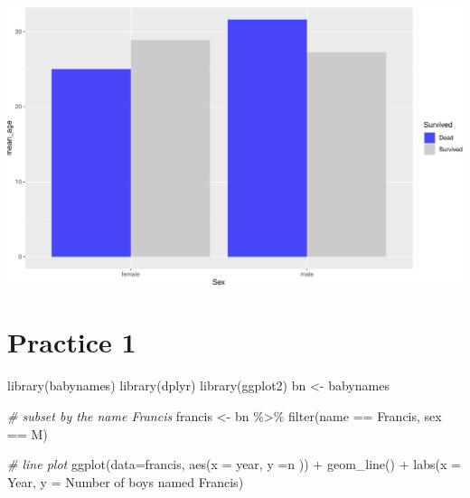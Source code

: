 \documentclass[
]{book}
\newenvironment{Shaded}{\begin{snugshade}}{\end{snugshade}}
\newcommand{\AttributeTok}[1]{\textcolor[rgb]{0.77,0.63,0.00}{#1}}
\newcommand{\CommentTok}[1]{\textcolor[rgb]{0.56,0.35,0.01}{\textit{#1}}}
\newcommand{\FunctionTok}[1]{\textcolor[rgb]{0.00,0.00,0.00}{#1}}
\newcommand{\NormalTok}[1]{#1}
\newcommand{\OtherTok}[1]{\textcolor[rgb]{0.56,0.35,0.01}{#1}}
\newcommand{\SpecialCharTok}[1]{\textcolor[rgb]{0.00,0.00,0.00}{#1}}
\newcommand{\StringTok}[1]{\textcolor[rgb]{0.31,0.60,0.02}{#1}}
\begin{document}
\includegraphics{figures/unnamed-chunk-147-1.pdf}

\hypertarget{practice-1}{%
\section*{Practice 1}\label{practice-1}}

\begin{Shaded}
\begin{Highlighting}[]
\FunctionTok{library}\NormalTok{(babynames)}
\FunctionTok{library}\NormalTok{(dplyr)}
\FunctionTok{library}\NormalTok{(ggplot2)}
\NormalTok{bn }\OtherTok{\textless{}{-}}\NormalTok{ babynames}

\CommentTok{\# subset by the name Francis}
\NormalTok{francis }\OtherTok{\textless{}{-}}\NormalTok{ bn }\SpecialCharTok{\%\textgreater{}\%} \FunctionTok{filter}\NormalTok{(name }\SpecialCharTok{==} \StringTok{\textquotesingle{}Francis\textquotesingle{}}\NormalTok{, sex }\SpecialCharTok{==} \StringTok{\textquotesingle{}M\textquotesingle{}}\NormalTok{)}

\CommentTok{\# line plot}
\FunctionTok{ggplot}\NormalTok{(}\AttributeTok{data=}\NormalTok{francis, }\FunctionTok{aes}\NormalTok{(}\AttributeTok{x =}\NormalTok{ year, }\AttributeTok{y =}\NormalTok{n )) }\SpecialCharTok{+} \FunctionTok{geom\_line}\NormalTok{() }\SpecialCharTok{+} \FunctionTok{labs}\NormalTok{(}\AttributeTok{x =} \StringTok{\textquotesingle{}Year\textquotesingle{}}\NormalTok{, }\AttributeTok{y =} \StringTok{\textquotesingle{}Number of boys named Francis\textquotesingle{}}\NormalTok{)}
\end{Highlighting}
\end{Shaded}
\end{document}
